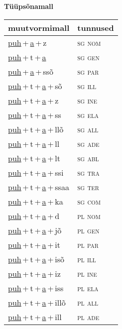 
\vspace{1.8em}
\begin{minipage}{\textwidth}
\textbf{Tüüpsõnamall \,}\\

\begin{sideways}
\begin{tabular}{l l}
muutvormimall & tunnused \\
\hline
\underline{puh}\,+\,\underline{a}\,+\,z & \textsc{ sg nom } \\
\underline{puh}\,+\,t\,+\,\underline{a} & \textsc{ sg gen } \\
\underline{puh}\,+\,\underline{a}\,+\,ssõ & \textsc{ sg par } \\
\underline{puh}\,+\,t\,+\,\underline{a}\,+\,sõ & \textsc{ sg ill } \\
\underline{puh}\,+\,t\,+\,\underline{a}\,+\,z & \textsc{ sg ine } \\
\underline{puh}\,+\,t\,+\,\underline{a}\,+\,ss & \textsc{ sg ela } \\
\underline{puh}\,+\,t\,+\,\underline{a}\,+\,llõ & \textsc{ sg all } \\
\underline{puh}\,+\,t\,+\,\underline{a}\,+\,ll & \textsc{ sg ade } \\
\underline{puh}\,+\,t\,+\,\underline{a}\,+\,lt & \textsc{ sg abl } \\
\underline{puh}\,+\,t\,+\,\underline{a}\,+\,ssi & \textsc{ sg tra } \\
\underline{puh}\,+\,t\,+\,\underline{a}\,+\,ssaa & \textsc{ sg ter } \\
\underline{puh}\,+\,t\,+\,\underline{a}\,+\,ka & \textsc{ sg com } \\
\underline{puh}\,+\,t\,+\,\underline{a}\,+\,d & \textsc{ pl nom } \\
\underline{puh}\,+\,t\,+\,\underline{a}\,+\,jõ & \textsc{ pl gen } \\
\underline{puh}\,+\,t\,+\,\underline{a}\,+\,it & \textsc{ pl par } \\
\underline{puh}\,+\,t\,+\,\underline{a}\,+\,isõ & \textsc{ pl ill } \\
\underline{puh}\,+\,t\,+\,\underline{a}\,+\,iz & \textsc{ pl ine } \\
\underline{puh}\,+\,t\,+\,\underline{a}\,+\,iss & \textsc{ pl ela } \\
\underline{puh}\,+\,t\,+\,\underline{a}\,+\,illõ & \textsc{ pl all } \\
\underline{puh}\,+\,t\,+\,\underline{a}\,+\,ill & \textsc{ pl ade } \\

\end{tabular}
\end{sideways}
\end{minipage}
